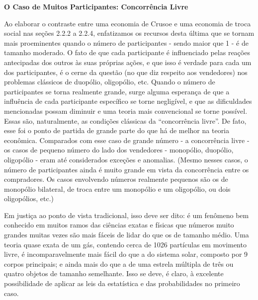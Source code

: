\documentclass[12pt]{article}
\begin{document}
\textbf{O Caso de Muitos Participantes: Concorrência Livre}

Ao elaborar o contraste entre uma economia de Crusoe e uma economia de troca social nas seções 2.2.2 a 2.2.4, enfatizamos os recursos desta última que se tornam mais proeminentes quando o número de participantes - sendo maior que 1 - é de tamanho moderado. O fato de que cada participante é influenciado pelas reações antecipadas dos outros às suas próprias ações, e que isso é verdade para cada um dos participantes, é o cerne da questão (no que diz respeito aos vendedores) nos problemas clássicos de duopólio, oligopólio, etc. Quando o número de participantes se torna realmente grande, surge alguma esperança de que a influência de cada participante específico se torne negligível, e que as dificuldades mencionadas possam diminuir e uma teoria mais convencional se torne possível. Essas são, naturalmente, as condições clássicas da “concorrência livre”. De fato, esse foi o ponto de partida de grande parte do que há de melhor na teoria econômica. Comparados com esse caso de grande número - a concorrência livre - os casos de pequeno número do lado dos vendedores - monopólio, duopólio, oligopólio - eram até considerados exceções e anomalias. (Mesmo nesses casos, o número de participantes ainda é muito grande em vista da concorrência entre os compradores. Os casos envolvendo números realmente pequenos são os de monopólio bilateral, de troca entre um monopólio e um oligopólio, ou dois oligopólios, etc.)

Em justiça ao ponto de vista tradicional, isso deve ser dito: é um fenômeno bem conhecido em muitos ramos das ciências exatas e físicas que números muito grandes muitas vezes são mais fáceis de lidar do que os de tamanho médio. Uma teoria quase exata de um gás, contendo cerca de 1026 partículas em movimento livre, é incomparavelmente mais fácil do que a do sistema solar, composto por 9 corpos principais; e ainda mais do que a de uma estrela múltipla de três ou quatro objetos de tamanho semelhante. Isso se deve, é claro, à excelente possibilidade de aplicar as leis da estatística e das probabilidades no primeiro caso.
\end{document}
